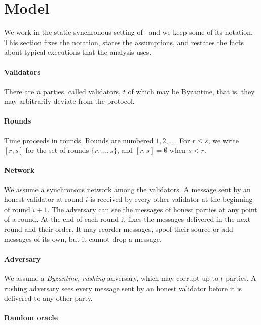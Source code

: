 \section{Model}
\label{sec.model}

We work in the static synchronous setting of~\cite{gkl24} and we keep some of
its notation. This section fixes the notation, states the assumptions, and
restates the facts about typical executions that the analysis uses.

\paragraph{Validators}

There are $n$ parties, called validators, $t$ of which may be Byzantine, that
is, they may arbitrarily deviate from the protocol.

\paragraph{Rounds}

Time proceeds in rounds. Rounds are numbered $1,2,\dots$. For $r \leq s$, we
write $[r,s]$ for the set of rounds $\{r,\dots,s\}$, and $[r,s]=\emptyset$ when
$s<r$.

\paragraph{Network}

We assume a synchronous network among the validators. A message sent by an
honest validator at round $i$ is received by every other validator at the
beginning of round $i+1$. The adversary can see the messages of honest parties
at any point of a round. At the end of each round it fixes the messages delivered in the next round
and their order. It may reorder messages, spoof their source or add messages
of its own, but it cannot drop a message.

\paragraph{Adversary}

We assume a \emph{Byzantine, rushing} adversary, which may corrupt up to $t$
parties. A rushing adversary sees every message sent by an honest validator
before it is delivered to any other party.

\paragraph{Random oracle}

